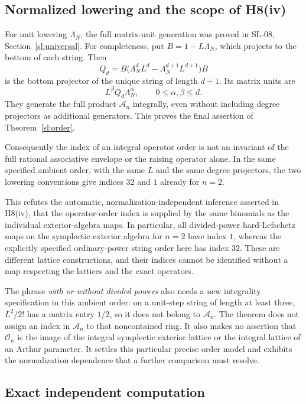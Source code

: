 \subsection{Normalized lowering and the scope of H8(iv)}

For unit lowering \(\Lambda_N\), the full matrix-unit
generation was proved in SL-08, Section~\ref{sl:universal}.
For completeness, put \(B=1-L\Lambda_N\), which projects
to the bottom of each string.  Then
\[
Q_d
=B\bigl(\Lambda_N^dL^d-\Lambda_N^{d+1}L^{d+1}\bigr)B
\]
is the bottom projector of the unique string of length
\(d+1\).  Its matrix units are
\[
L^\beta Q_d\Lambda_N^\alpha,\qquad
0\le\alpha,\beta\le d.
\]
They generate the full product \(\mathcal A_n\) integrally,
even without including degree projectors as additional
generators.  This proves the final assertion of
Theorem~\ref{sl:order}.

Consequently the index of an integral operator order is
not an invariant of the full rational associative envelope
or the raising operator alone.  In the same specified
ambient order, with the same \(L\) and the same degree
projectors, the two lowering conventions give indices
\(32\) and \(1\) already for \(n=2\).

This refutes the automatic, normalization-independent
inference asserted in H8(iv), that the operator-order
index is supplied by the same binomials as the individual
exterior-algebra maps.  In particular, all divided-power
hard-Lefschetz maps on the symplectic exterior algebra for
\(n=2\) have index \(1\), whereas the explicitly specified
ordinary-power string order here has index \(32\).
These are different lattice constructions, and their
indices cannot be identified without a map respecting
the lattices and the exact operators.

The phrase \emph{with or without divided powers} also needs
a new integrality specification in this ambient order:
on a unit-step string of length at least three,
\(L^2/2!\) has a matrix entry \(1/2\), so it does not
belong to \(\mathcal A_n\).  The theorem does not assign
an index in \(\mathcal A_n\) to that noncontained ring.
It also makes no assertion that \(\mathcal O_n\) is the
image of the integral symplectic exterior lattice or the
integral lattice of an Arthur parameter.  It settles this
particular precise order model and exhibits the
normalization dependence that a further comparison must
resolve.

\subsection{Exact independent computation}

